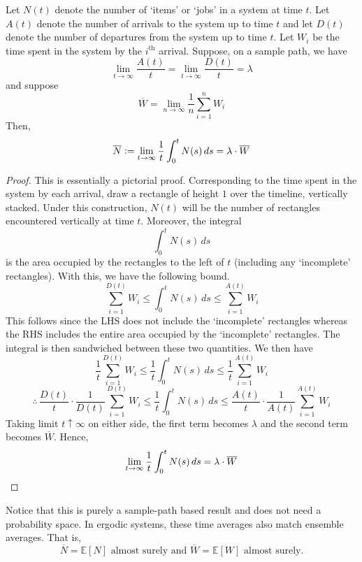\documentclass[12pt]{article}
\def\E{\mathbb{E}}
\theoremstyle{definition}
\begin{document}
\begin{thm}
    Let $N(t)$ denote the number of `items' or `jobs' in a system at time $t$. Let $A(t)$ denote the number of arrivals to the system up to time $t$ and let $D(t)$ denote the number of departures from the system up to time $t$. Let $W_i$ be the time spent in the system by the $i^{\text{th}}$ arrival. Suppose, on a sample path, we have
    \[
        \lim_{t \to \infty} \frac{A(t)}{t} = \lim_{t \to \infty} \frac{D(t)}{t} = \lambda
    \]
    and suppose 
    \[
        \overline{W} = \lim_{n \to \infty} \frac{1}{n} \sum_{i=1}^n W_i
    \]
    Then,
    \[
        \overline{N} \vcentcolon= \lim_{t \to \infty} \frac{1}{t} \int_0^t N(s) \, ds = \lambda \cdot \overline{W}
    \]  
\end{thm}
\begin{proof}
    This is essentially a pictorial proof. Corresponding to the time spent in the system by each arrival, draw a rectangle of height $1$ over the timeline, vertically stacked. Under this construction, $N(t)$ will be the number of rectangles encountered vertically at time $t$. Moreover, the integral
    \[
        \int_0^t N(s) \, ds 
    \]
    is the area occupied by the rectangles to the left of $t$ (including any `incomplete' rectangles). With this, we have the following bound.
    \[
        \sum_{i=1}^{D(t)} W_i \leq \int_0^t N(s) \, ds \leq \sum_{i=1}^{A(t)} W_i
    \]
    This follows since the LHS does not include the `incomplete' rectangles whereas the RHS includes the entire area occupied by the `incomplete' rectangles. The integral is then sandwiched between these two quantities. We then have    
    \[
        \frac{1}{t} \sum_{i=1}^{D(t)} W_i \leq \frac{1}{t} \int_0^t N(s) \, ds \leq \frac{1}{t} \sum_{i=1}^{A(t)} W_i
    \]
    \[
        \therefore \, \frac{D(t)}{t} \cdot \frac{1}{D(t)}\sum_{i=1}^{D(t)} W_i \leq \frac{1}{t} \int_0^t N(s) \, ds \leq \frac{A(t)}{t} \cdot \frac{1}{A(t)} \sum_{i=1}^{A(t)} W_i
    \]
    Taking limit $t \uparrow \infty$ on either side, the first term becomes $\lambda$ and the second term becomes $\overline{W}$. Hence, 
    \[
        \lim_{t \to \infty} \frac{1}{t} \int_0^t N(s) \, ds = \lambda \cdot \overline{W} \qedhere
    \]
\end{proof}

Notice that this is purely a sample-path based result and does not need a probability space. In ergodic systems, these time averages also match ensemble averages. That is,
\[
    \overline{N} = \E[N] \text{ almost surely and  } \overline{W} = \E[W] \text{ almost surely.}
\]
\end{document}
